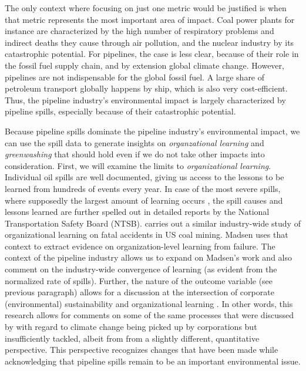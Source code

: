 The only context where focusing on just one metric would be justified is when that metric represents the most important area of impact. Coal power plants for instance are characterized by the high number of respiratory problems and indirect deaths they cause through air pollution, and the nuclear industry by its catastrophic potential. For pipelines, the case is less clear, because of their role in the fossil fuel supply chain, and by extension global climate change. However, pipelines are not indispensable for the global fossil fuel. A large share of petroleum transport globally happens by ship, which is also very cost-efficient. Thus, the pipeline industry's environmental impact is largely characterized by pipeline spills, especially because of their catastrophic potential.

Because pipeline spills dominate the pipeline industry's environmental impact, we can use the spill data to generate insights on \textit{organzational learning} and \textit{greenwashing} that should hold even if we do not take other impacts into consideration. First, we will examine the limits to \textit{organizational learning}. Individual oil spills are well documented, giving us access to the lessons to be learned from hundreds of events every year. In case of the most severe spills, where supposedly the largest amount of learning occurs \citep{Madsen2010}, the spill causes and lessons learned are further spelled out in detailed reports by the National Transportation Safety Board (NTSB). \citet{Madsen2009} carries out a similar industry-wide study of organizational learning on fatal accidents in US coal mining. Madsen uses that context to extract evidence on organization-level learning from failure. The context of the pipeline industry allows us to expand on Madsen's work and also comment on the industry-wide convergence of learning (as evident from the normalized rate of spills). Further, the nature of the outcome variable (see previous paragraph) allows for a discussion at the intersection of corporate (environmental) sustainability and organizational learning \citep{George2015}. In other words, this research allows for comments on some of the same processes that were discussed by \citet{Wright2017} with regard to climate change being picked up by corporations but insufficiently tackled, albeit from from a slightly different, quantitative perspective. This perspective recognizes changes that have been made while acknowledging that pipeline spills remain to be an important environmental issue.

